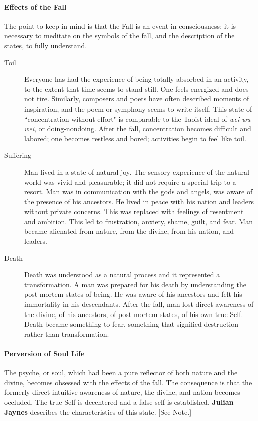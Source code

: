 \paragraph{Effects of the Fall}
The point to keep in mind is that the Fall is an event in consciousness; it is necessary to meditate on the symbols of the fall, and the description of the states, to fully understand.

\begin{description}
\item[Toil ]

Everyone has had the experience of being totally absorbed in an activity, to the extent that time seems to stand still. One feels energized and does not tire. Similarly, composers and poets have often described moments of inspiration, and the poem or symphony seems to write itself. This state of ``concentration without effort" is comparable to the Taoist ideal of \emph{wei-wu-wei}, or doing-nondoing. After the fall, concentration becomes difficult and labored; one becomes restless and bored; activities begin to feel like toil. 

\item[Suffering ]

Man lived in a state of natural joy. The sensory experience of the natural world was vivid and pleasurable; it did not require a special trip to a resort. Man was in communication with the gods and angels, was aware of the presence of his ancestors. He lived in peace with his nation and leaders without private concerns. This was replaced with feelings of resentment and ambition. This led to frustration, anxiety, shame, guilt, and fear. Man became alienated from nature, from the divine, from his nation, and leaders. 

\item[Death ]

Death was understood as a natural process and it represented a transformation. A man was prepared for his death by understanding the post-mortem states of being. He was aware of his ancestors and felt his immortality in his descendants. After the fall, man lost direct awareness of the divine, of his ancestors, of post-mortem states, of his own true Self. Death became something to fear, something that signified destruction rather than transformation. 

\end{description}
\paragraph{Perversion of Soul Life}
The psyche, or soul, which had been a pure reflector of both nature and the divine, becomes obsessed with the effects of the fall. The consequence is that the formerly direct intuitive awareness of nature, the divine, and nation becomes occluded. The true Self is decentered and a false self is established. \textbf{Julian Jaynes} describes the characteristics of this state. [See Note.]

